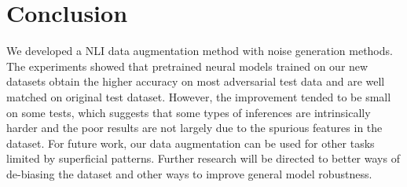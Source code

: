 \section{Conclusion}
\label{sec:conclusion}
We developed a NLI data augmentation method with noise generation methods.
The experiments showed
that pretrained neural models trained on our new datasets 
obtain the higher accuracy on most adversarial test data 
and are well matched on original test dataset. 
However, the improvement tended to be small on some tests,
which suggests that some types of inferences are intrinsically harder 
and the poor results are not largely due to the spurious features in the dataset.
For future work, our data augmentation can be
used for other tasks limited by superficial patterns. 
Further research will be directed to better
ways of de-biasing the dataset and other ways to improve general model robustness.

